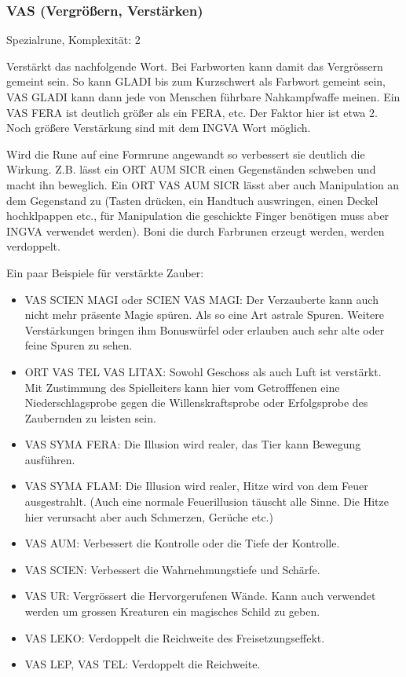 \documentclass{article}
\begin{document}
\subsubsection{VAS (Vergrößern, Verstärken)}

Spezialrune, Komplexität: 2

Verstärkt das nachfolgende Wort. Bei Farbworten kann damit das Vergrössern gemeint sein. So kann GLADI bis zum
Kurzschwert als Farbwort gemeint sein, VAS GLADI kann dann jede von Menschen führbare Nahkampfwaffe meinen. Ein
VAS FERA ist deutlich größer als ein FERA, etc. Der Faktor hier ist etwa 2. Noch größere Verstärkung sind mit dem
INGVA Wort möglich.

Wird die Rune auf eine Formrune angewandt so verbessert sie deutlich die Wirkung. Z.B. lässt ein ORT AUM SICR einen
Gegenständen schweben und macht ihn beweglich. Ein ORT VAS AUM SICR lässt aber auch Manipulation an dem Gegenstand zu
(Tasten drücken, ein Handtuch auswringen, einen Deckel hochklpappen etc., für Manipulation die geschickte Finger
benötigen muss aber INGVA verwendet werden). Boni die durch Farbrunen erzeugt werden, werden verdoppelt.

Ein paar Beispiele für verstärkte Zauber:

\begin{itemize}
\item VAS SCIEN MAGI oder SCIEN VAS MAGI: Der Verzauberte kann auch nicht mehr präsente Magie spüren. Als so eine Art astrale Spuren. Weitere Verstärkungen bringen ihm Bonuswürfel oder erlauben auch sehr alte oder feine Spuren zu sehen.
\item ORT VAS TEL VAS LITAX: Sowohl Geschoss als auch Luft ist verstärkt. Mit Zustimmung des Spielleiters kann hier vom Getrofffenen eine Niederschlagsprobe gegen die Willenskraftsprobe oder Erfolgsprobe des Zaubernden zu leisten sein.
\item VAS SYMA FERA: Die Illusion wird realer, das Tier kann Bewegung ausführen.
\item VAS SYMA FLAM: Die Illusion wird realer, Hitze wird von dem Feuer ausgestrahlt. (Auch eine normale Feuerillusion täuscht alle Sinne. Die Hitze hier verursacht aber auch Schmerzen, Gerüche etc.)
\item VAS AUM: Verbessert die Kontrolle oder die Tiefe der Kontrolle.
\item VAS SCIEN: Verbessert die Wahrnehmungstiefe und Schärfe.
\item VAS UR: Vergrössert die Hervorgerufenen Wände. Kann auch verwendet werden um grossen Kreaturen ein magisches Schild zu geben.
\item VAS LEKO: Verdoppelt die Reichweite des Freisetzungseffekt.
\item VAS LEP, VAS TEL: Verdoppelt die Reichweite.
\end{itemize}
\end{document}
